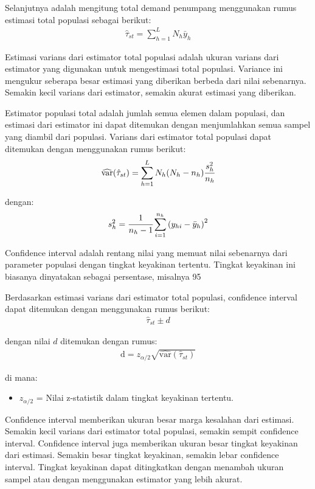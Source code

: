 \documentclass{article}
\begin{document}
Selanjutnya adalah mengitung total demand penumpang menggunakan rumus estimasi total populasi sebagai berikut:
\begin{align}
    \hat{\tau}_{st} = \sum_{h=1}^{L} N_{h} \bar{y}_{h}
\end{align}

Estimasi varians dari estimator total populasi adalah ukuran varians dari estimator yang digunakan untuk mengestimasi total populasi. Variance ini mengukur seberapa besar estimasi yang diberikan berbeda dari nilai sebenarnya. Semakin kecil varians dari estimator, semakin akurat estimasi yang diberikan.

Estimator populasi total adalah jumlah semua elemen dalam populasi, dan estimasi dari estimator ini dapat ditemukan dengan menjumlahkan semua sampel yang diambil dari populasi. Varians dari estimator total populasi dapat ditemukan dengan menggunakan rumus berikut:
\begin{align}
    \widehat{\text{var}}(\hat{\tau}_{st}) = \sum_{h=1}^{L} 
    N_{h} (N_{h}-n_{h})
    \cfrac{s_{h}^{2}}{n_{h}}
\end{align}

dengan:
\begin{align}
    s_{h}^{2} = \cfrac{1}{n_{h}-1}
    \sum_{i=1}^{n_{h}}
    \left ( y_{hi} - \bar{y}_{h} \right )^{2}
\end{align}

Confidence interval adalah rentang nilai yang memuat nilai sebenarnya dari parameter populasi dengan tingkat keyakinan tertentu. Tingkat keyakinan ini biasanya dinyatakan sebagai persentase, misalnya 95%

Berdasarkan estimasi varians dari estimator total populasi, confidence interval dapat ditemukan dengan menggunakan rumus berikut:
\begin{align}
    \hat{\tau}_{st} \pm d
\end{align}

dengan nilai $d$ ditemukan dengan rumus:
\begin{align}
    \text{d} = z_{\alpha/2} \sqrt{\widehat{\text{var}}(\hat{\tau}_{st})}
\end{align}

di mana:
\begin{itemize}
    \item $z_{\alpha/2}$ = Nilai z-statistik dalam tingkat keyakinan tertentu.
\end{itemize}

Confidence interval memberikan ukuran besar marga kesalahan dari estimasi. Semakin kecil varians dari estimator total populasi, semakin sempit confidence interval. Confidence interval juga memberikan ukuran besar tingkat keyakinan dari estimasi. Semakin besar tingkat keyakinan, semakin lebar confidence interval. Tingkat keyakinan dapat ditingkatkan dengan menambah ukuran sampel atau dengan menggunakan estimator yang lebih akurat.
\end{document}
